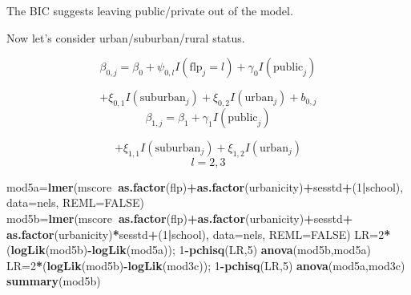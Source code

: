 \documentclass[ignorenonframetext,]{beamer}
\newenvironment{Shaded}{\begin{snugshade}}{\end{snugshade}}
\newcommand{\KeywordTok}[1]{\textcolor[rgb]{0.13,0.29,0.53}{\textbf{#1}}}
\newcommand{\DataTypeTok}[1]{\textcolor[rgb]{0.13,0.29,0.53}{#1}}
\newcommand{\DecValTok}[1]{\textcolor[rgb]{0.00,0.00,0.81}{#1}}
\newcommand{\StringTok}[1]{\textcolor[rgb]{0.31,0.60,0.02}{#1}}
\newcommand{\OtherTok}[1]{\textcolor[rgb]{0.56,0.35,0.01}{#1}}
\newcommand{\OperatorTok}[1]{\textcolor[rgb]{0.81,0.36,0.00}{\textbf{#1}}}
\newcommand{\NormalTok}[1]{#1}
\begin{document}
\begin{frame}[fragile]{}
The BIC suggests leaving public/private out of the model.

\end{frame}

\begin{frame}[fragile]{}

Now let's consider urban/suburban/rural status.

\[\beta_{0,j}=\beta_0+\psi_{0,l}I(\text{flp}_j=l)+\gamma_0I(\text{public}_j)\]

\[+\xi_{0,1}I(\text{suburban}_j)+\xi_{0,2}I(\text{urban}_j)+b_{0,j}\]
\[\beta_{1,j}=\beta_1+\gamma_1I(\text{public}_j)\]

\[+\xi_{1,1}I(\text{suburban}_j)+\xi_{1,2}I(\text{urban}_j)\] \[l=2,3\]

\begin{Shaded}
\begin{Highlighting}[]
\NormalTok{mod5a=}\KeywordTok{lmer}\NormalTok{(mscore}\OperatorTok{~}\KeywordTok{as.factor}\NormalTok{(flp)}\OperatorTok{+}\KeywordTok{as.factor}\NormalTok{(urbanicity)}\OperatorTok{+}\NormalTok{sesstd}\OperatorTok{+}\NormalTok{(}\DecValTok{1}\OperatorTok{|}\NormalTok{school),}
           \DataTypeTok{data=}\NormalTok{nels, }\DataTypeTok{REML=}\OtherTok{FALSE}\NormalTok{)}
\NormalTok{mod5b=}\KeywordTok{lmer}\NormalTok{(mscore}\OperatorTok{~}\KeywordTok{as.factor}\NormalTok{(flp)}\OperatorTok{+}\KeywordTok{as.factor}\NormalTok{(urbanicity)}\OperatorTok{+}\NormalTok{sesstd}\OperatorTok{+}
\StringTok{             }\KeywordTok{as.factor}\NormalTok{(urbanicity)}\OperatorTok{*}\NormalTok{sesstd}\OperatorTok{+}\NormalTok{(}\DecValTok{1}\OperatorTok{|}\NormalTok{school),}
           \DataTypeTok{data=}\NormalTok{nels, }\DataTypeTok{REML=}\OtherTok{FALSE}\NormalTok{)}
\NormalTok{LR=}\DecValTok{2}\OperatorTok{*}\NormalTok{(}\KeywordTok{logLik}\NormalTok{(mod5b)}\OperatorTok{-}\KeywordTok{logLik}\NormalTok{(mod5a)); }\DecValTok{1}\OperatorTok{-}\KeywordTok{pchisq}\NormalTok{(LR,}\DecValTok{5}\NormalTok{)}
\KeywordTok{anova}\NormalTok{(mod5b,mod5a)}
\NormalTok{LR=}\DecValTok{2}\OperatorTok{*}\NormalTok{(}\KeywordTok{logLik}\NormalTok{(mod5b)}\OperatorTok{-}\KeywordTok{logLik}\NormalTok{(mod3c)); }\DecValTok{1}\OperatorTok{-}\KeywordTok{pchisq}\NormalTok{(LR,}\DecValTok{5}\NormalTok{)}
\KeywordTok{anova}\NormalTok{(mod5a,mod3c)}
\KeywordTok{summary}\NormalTok{(mod5b)}
\end{Highlighting}
\end{Shaded}

\end{frame}
\end{document}
